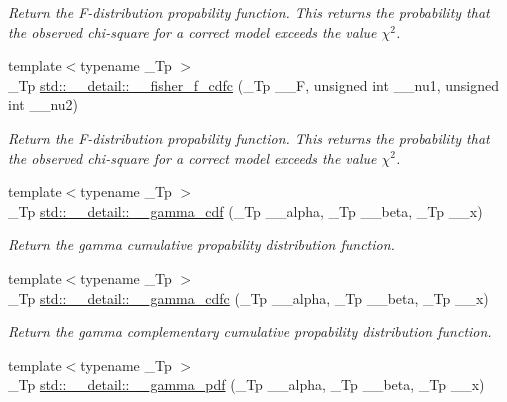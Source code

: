 \begin{DoxyCompactItemize}
\begin{DoxyCompactList}\small\item\em Return the F-\/distribution propability function. This returns the probability that the observed chi-\/square for a correct model exceeds the value $ \chi^2 $. \end{DoxyCompactList}\item 
{\footnotesize template$<$typename \+\_\+\+Tp $>$ }\\\+\_\+\+Tp \hyperlink{namespacestd_1_1____detail_ae02418cde6461a9e65f926c974c216a2}{std\+::\+\_\+\+\_\+detail\+::\+\_\+\+\_\+fisher\+\_\+f\+\_\+cdfc} (\+\_\+\+Tp \+\_\+\+\_\+F, unsigned int \+\_\+\+\_\+nu1, unsigned int \+\_\+\+\_\+nu2)
\begin{DoxyCompactList}\small\item\em Return the F-\/distribution propability function. This returns the probability that the observed chi-\/square for a correct model exceeds the value $ \chi^2 $. \end{DoxyCompactList}\item 
{\footnotesize template$<$typename \+\_\+\+Tp $>$ }\\\+\_\+\+Tp \hyperlink{namespacestd_1_1____detail_aa4f1cd082a56f66b7ac2f8d805f66a81}{std\+::\+\_\+\+\_\+detail\+::\+\_\+\+\_\+gamma\+\_\+cdf} (\+\_\+\+Tp \+\_\+\+\_\+alpha, \+\_\+\+Tp \+\_\+\+\_\+beta, \+\_\+\+Tp \+\_\+\+\_\+x)
\begin{DoxyCompactList}\small\item\em Return the gamma cumulative propability distribution function. \end{DoxyCompactList}\item 
{\footnotesize template$<$typename \+\_\+\+Tp $>$ }\\\+\_\+\+Tp \hyperlink{namespacestd_1_1____detail_a7dc59114c8c223b5570c374a7192d404}{std\+::\+\_\+\+\_\+detail\+::\+\_\+\+\_\+gamma\+\_\+cdfc} (\+\_\+\+Tp \+\_\+\+\_\+alpha, \+\_\+\+Tp \+\_\+\+\_\+beta, \+\_\+\+Tp \+\_\+\+\_\+x)
\begin{DoxyCompactList}\small\item\em Return the gamma complementary cumulative propability distribution function. \end{DoxyCompactList}\item 
{\footnotesize template$<$typename \+\_\+\+Tp $>$ }\\\+\_\+\+Tp \hyperlink{namespacestd_1_1____detail_a13146321e4e094815de990c33b83b02a}{std\+::\+\_\+\+\_\+detail\+::\+\_\+\+\_\+gamma\+\_\+pdf} (\+\_\+\+Tp \+\_\+\+\_\+alpha, \+\_\+\+Tp \+\_\+\+\_\+beta, \+\_\+\+Tp \+\_\+\+\_\+x)

\end{DoxyCompactItemize}

